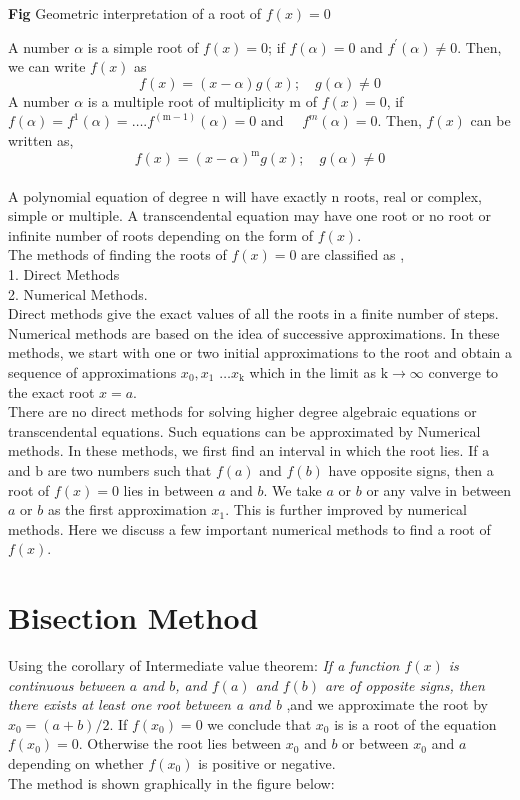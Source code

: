 \documentclass[12pt,a4paper,oneside]{book}
\begin{document}
\begin{center}
	\textbf{Fig} Geometric interpretation of a root of $f(x)=0$
\end{center} 
A number $\alpha$ is a simple root of $f(x)=0$; if $f(\alpha)=0$ and $f^{\prime}(\alpha) \neq 0$. Then, we can write $f(x)$ as $$ f(x)=(x-\alpha) g(x);\quad g(\alpha) \neq 0 $$ A number $\alpha$ is a multiple root of multiplicity $\mathrm{m}$ of $f(x)=0$, if $f(\alpha)=f^1(\alpha)=\ldots . f^{(\mathrm{m}-1)}(\alpha)=0$ and $\quad f^m(\alpha)=0$. Then, $f(x)$ can be written as, $$ f(x)=(x-\alpha)^{\mathrm{m}} g(x);\quad g(\alpha) \neq 0 $$\\
A polynomial equation of degree $\mathrm{n}$ will have exactly $\mathrm{n}$ roots, real or complex, simple or multiple. A transcendental equation may have one root or no root or infinite number of roots depending on the form of $f(x)$. \\ The methods of finding the roots of $f(x)=0$ are classified as ,\\
1. Direct Methods\\ 2. Numerical Methods. \\ 
Direct methods give the exact values of all the roots in a finite number of steps. Numerical methods are based on the idea of successive approximations. In these methods, we start with one or two initial approximations to the root and obtain a sequence of approximations $x_0, x_1$ $\ldots x_{\mathrm{k}}$ which in the limit as $\mathrm{k} \rightarrow \infty$ converge to the exact root $x=a$.\\ 
There are no direct methods for solving higher degree algebraic equations or transcendental equations. Such equations can be approximated by Numerical methods. In these methods, we first find an interval in which the root lies. If $\mathrm{a}$ and $\mathrm{b}$ are two numbers such that $f(a)$ and $f(b)$ have opposite signs, then a root of $f(x)=0$ lies in between $a$ and $b$. We take $a$ or $b$ or any valve in between $a$ or $b$ as the first approximation $x_1$. This is further improved by numerical methods. Here we discuss a few important numerical methods to find a root of $f(x)$.

\section{Bisection Method}
Using the corollary of Intermediate value theorem:\textit{ If a function $f(x)$ is continuous 
	between $a$ and $b$, and $f(a)$ and $f(b)$ are of opposite signs, 
	then there exists at least one root between a and b} ,and we approximate the root by $x_0=(a+b)/2$. If $f(x_0)=0$
we conclude that $x_0$  is is a root of the equation $f(x_0)=0$. Otherwise the root lies between $x_0$ and  $b$ or between $x_0$  and $a$ depending on whether $f(x_0)$ is positive
or negative.\\
The method is shown graphically in the figure below:
\end{document}

